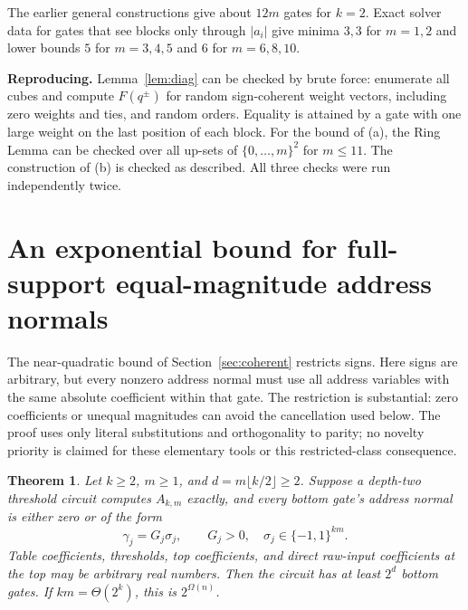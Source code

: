 \documentclass[11pt,letterpaper]{article}
\newtheorem{theorem}{Theorem}
\theoremstyle{remark}
\newcommand{\sect}[1]{\section{\texorpdfstring{\color{ink}#1}{#1}}}
\newcommand{\smalltitle}[1]{\textbf{\color{ink}#1}\quad}
\begin{document}
The earlier general constructions give about $12m$ gates for $k=2$. Exact
solver data for gates that see blocks only through $|a_i|$ give minima $3,3$
for $m=1,2$ and lower bounds $5$ for $m=3,4,5$ and $6$ for $m=6,8,10$.

\smalltitle{Reproducing.}
Lemma~\ref{lem:diag} can be checked by brute force: enumerate all cubes and
compute $F(q^\pm)$ for random sign-coherent weight vectors, including zero
weights and ties, and random orders. Equality is attained by a gate with one
large weight on the last position of each block. For the bound of (a), the
Ring Lemma can be checked over all up-sets of $\{0,\dots,m\}^2$ for
$m\le11$. The construction of (b) is checked as described. All three checks
were run independently twice.

\sect{An exponential bound for full-support equal-magnitude address normals}\label{sec:fullsign}

The near-quadratic bound of Section~\ref{sec:coherent} restricts signs.
Here signs are arbitrary, but every nonzero address normal must use all
address variables with the same absolute coefficient within that gate.
The restriction is substantial: zero coefficients or unequal magnitudes
can avoid the cancellation used below. The proof uses only literal
substitutions and orthogonality to parity; no novelty priority is claimed
for these elementary tools or this restricted-class consequence.

\begin{theorem}\label{thm:fullsign}
Let $k\ge2$, $m\ge1$, and $d=m\lfloor k/2\rfloor\ge2$. Suppose a depth-two
threshold circuit computes $A_{k,m}$ exactly, and every bottom gate's address
normal is either zero or of the form
$$
\gamma_j=G_j\sigma_j,\qquad G_j>0,\quad
\sigma_j\in\{-1,1\}^{km}.
$$
Table coefficients, thresholds, top coefficients, and direct raw-input
coefficients at the top may be arbitrary real numbers. Then the circuit
has at least $2^d$ bottom gates. If $km=\Theta(2^k)$, this is $2^{\Omega(n)}$.
\end{theorem}
\end{document}

